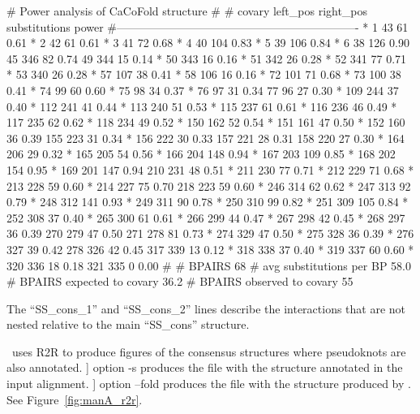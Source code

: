 \begin{sreoutput}
# Power analysis of CaCoFold structure 
#
# covary  left_pos      right_pos    substitutions      power
#----------------------------------------------------------------
     *    1		43		61		0.61
     *    2		42		61		0.61
     *    3		41		72		0.68
     *    4		40		104		0.83
     *    5		39		106		0.84
     *    6		38		126		0.90
          45		346		82		0.74
          49		344		15		0.14
     *    50		343		16		0.16
     *    51		342		26		0.28
     *    52		341		77		0.71
     *    53		340		26		0.28
     *    57		107		38		0.41
     *    58		106		16		0.16
     *    72		101		71		0.68
     *    73		100		38		0.41
     *    74		99		60		0.60
     *    75		98		34		0.37
     *    76		97		31		0.34
          77		96		27		0.30
     *    109		244		37		0.40
     *    112		241		41		0.44
     *    113		240		51		0.53
     *    115		237		61		0.61
     *    116		236		46		0.49
     *    117		235		62		0.62
     *    118		234		49		0.52
     *    150		162		52		0.54
     *    151		161		47		0.50
     *    152		160		36		0.39
          155		223		31		0.34
     *    156		222		30		0.33
          157		221		28		0.31
          158		220		27		0.30
     *    164		206		29		0.32
     *    165		205		54		0.56
     *    166		204		148		0.94
     *    167		203		109		0.85
     *    168		202		154		0.95
     *    169		201		147		0.94
          210		231		48		0.51
     *    211		230		77		0.71
     *    212		229		71		0.68
     *    213		228		59		0.60
     *    214		227		75		0.70
          218		223		59		0.60
     *    246		314		62		0.62
     *    247		313		92		0.79
     *    248		312		141		0.93
     *    249		311		90		0.78
     *    250		310		99		0.82
     *    251		309		105		0.84
     *    252		308		37		0.40
     *    265		300		61		0.61
     *    266		299		44		0.47
     *    267		298		42		0.45
     *    268		297		36		0.39
          270		279		47		0.50
          271		278		81		0.73
     *    274		329		47		0.50
     *    275		328		36		0.39
     *    276		327		39		0.42
          278		326		42		0.45
          317		339		13		0.12
     *    318		338		37		0.40
     *    319		337		60		0.60
     *    320		336		18		0.18
          321		335		0		0.00
#
# BPAIRS 68
# avg substitutions per BP  58.0
# BPAIRS expected to covary 36.2
# BPAIRS observed to covary 55
\end{sreoutput}

\noindent
 The ``SS\_cons\_1'' and ``SS\_cons\_2'' lines describe the
 interactions that are not nested relative to the main ``SS\_cons''
 structure.

\rscape\, uses R2R to produce figures of the consensus structures
where pseudoknots are also annotated.  \rscape] option -s produces the
  file  with the structure
  annotated in the input alignment. \rscape] option --fold produces the
    file  with the
    structure produced by \rscape. See Figure~\ref{fig:manA_r2r}.


